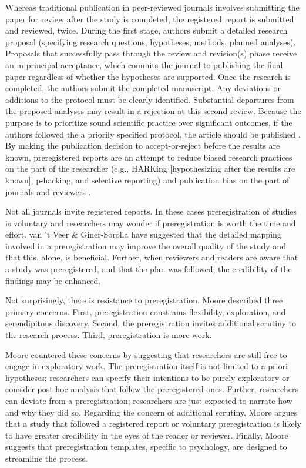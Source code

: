 \documentclass[
  11pt,
]{book}
\begin{document}
Whereas traditional publication in peer-reviewed journals involves submitting the paper for review after the study is completed, the registered report is submitted and reviewed, twice. During the first stage, authors submit a detailed research proposal (specifying research questions, hypotheses, methods, planned analyses). Proposals that successfully pass through the review and revision(s) phase receive an in principal acceptance, which commits the journal to publishing the final paper regardless of whether the hypotheses are supported. Once the research is completed, the authors submit the completed manuscript. Any deviations or additions to the protocol must be clearly identified. Substantial departures from the proposed analyses may result in a rejection at this second review. Because the purpose is to prioritize sound scientific practice over significant outcomes, if the authors followed the a priorily specified protocol, the article should be published \citep{chambers_past_2022}. By making the publication decision to accept-or-reject before the results are known, preregistered reports are an attempt to reduce biased research practices on the part of the researcher (e.g., HARKing {[}hypothesizing after the results are known{]}, p-hacking, and selective reporting) and publication bias on the part of journals and reviewers \citep{chambers_past_2022, van_t_veer_pre-registration_2016}.

Not all journals invite registered reports. In these cases preregistration of studies is voluntary and researchers may wonder if preregistration is worth the time and effort. van 't Veer \& Giner-Sorolla \citep{van_t_veer_pre-registration_2016} have suggested that the detailed mapping involved in a preregistration may improve the overall quality of the study and that this, alone, is beneficial. Further, when reviewers and readers are aware that a study was preregistered, and that the plan was followed, the credibility of the findings may be enhanced.

Not surprisingly, there is resistance to preregistration. Moore \citeyearpar{moore_preregister_2016} described three primary concerns. First, preregistration constrains flexibility, exploration, and serendipitous discovery. Second, the preregistration invites additional scrutiny to the research process. Third, preregistration is more work.

Moore \citeyearpar{moore_preregister_2016} countered these concerns by suggesting that researchers are still free to engage in exploratory work. The preregistration itself is not limited to a priori hypotheses; researchers can specify their intentions to be purely exploratory or consider post-hoc analysis that follow the preregistered ones. Further, researchers can deviate from a preregistration; researchers are just expected to narrate how and why they did so. Regarding the concern of additional scrutiny, Moore argues that a study that followed a registered report or voluntary preregistration is likely to have greater credibility in the eyes of the reader or reviewer. Finally, Moore suggests that preregistration templates, specific to psychology, are designed to streamline the process.
\end{document}
